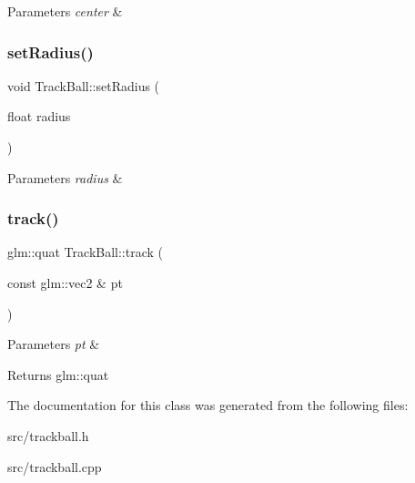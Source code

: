 \begin{DoxyParams}{Parameters}
{\em center} & \\
\hline
\end{DoxyParams}
\mbox{\label{class_track_ball_ab4d35e045512cb2d6d1081f171fbf7d4}} 
\subsubsection{\texorpdfstring{set\+Radius()}{setRadius()}}
{\footnotesize\ttfamily void Track\+Ball\+::set\+Radius (\begin{DoxyParamCaption}\item[{float}]{radius }\end{DoxyParamCaption})\hspace{0.3cm}{\ttfamily [inline]}}


\begin{DoxyParams}{Parameters}
{\em radius} & \\
\hline
\end{DoxyParams}
\mbox{\label{class_track_ball_aa562dadd39fcb9b859026ba14a5ea75f}} 
\subsubsection{\texorpdfstring{track()}{track()}}
{\footnotesize\ttfamily glm\+::quat Track\+Ball\+::track (\begin{DoxyParamCaption}\item[{const glm\+::vec2 \&}]{pt }\end{DoxyParamCaption})\hspace{0.3cm}{\ttfamily [inline]}}


\begin{DoxyParams}{Parameters}
{\em pt} & \\
\hline
\end{DoxyParams}
\begin{DoxyReturn}{Returns}
glm\+::quat 
\end{DoxyReturn}


The documentation for this class was generated from the following files\+:\begin{DoxyCompactItemize}
\item 
src/trackball.\+h\item 
src/trackball.\+cpp\end{DoxyCompactItemize}
